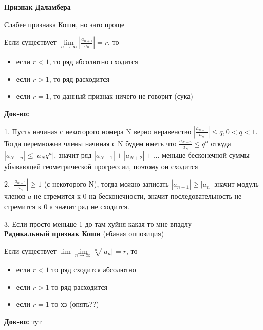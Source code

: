 \documentclass{article}
\begin{document}
	
	
	{\bf Признак Даламбера}
	
	Слабее признака Коши, но зато проще
	
	Если существует $\lim\limits_{n \rightarrow \infty}|\frac{a_{n + 1}}{a_n}| = r$, то 
	
	\begin{itemize}
		\item если $r < 1$, то ряд абсолютно сходится
		\item если $r > 1$, то ряд расходится
		\item если $r = 1$, то данный признак ничего не говорит (сука)
	\end{itemize}
	
	{\bf Док-во:}
	
	1. Пусть начиная с некоторого номера N верно неравенство $|\frac{a_{n+1}}{a_n}| \le q, 0 < q < 1$. Тогда перемножив члены начиная с N будем иметь что $\frac{a_{N+n}}{a_N} \le q^n$ откуда $|a_{N+n}| \le |a_{N}q^n|$, значит ряд $|a_{N+1}| + |a_{N+2}| + ...$ меньше бесконечной суммы убывающей геометрической прогрессии, поэтому он сходится
	
	2. $|\frac{a_{n + 1}}{a_n}| \ge 1$ (с некоторого N), тогда можно записать $|a_{n+1}| \ge |a_n|$ значит модуль членов $a$ не стремится к 0 на бесконечности, значит последовательность не стремится к 0 а значит ряд не сходится.
	
	3. Если просто меньше 1 до там хуйня какая-то мне впадлу
	\\
	
	{\bf Радикальный признак Коши} (ебаная оппозиция)
	
	Если существует $\lim\lim\limits_{n \rightarrow \infty} \sqrt[n]{|a_n|} = r$, то
	
	\begin{itemize}
		\item если $r < 1$ то ряд сходится абсолютно
		\item если $r > 1$ то ряд расходится
		\item если $r = 1$ то хз (опять??)
	\end{itemize}
	
	{\bf Док-во:} \href{https://ru.wikipedia.org/wiki/%D0%A0%D0%B0%D0%B4%D0%B8%D0%BA%D0%B0%D0%BB%D1%8C%D0%BD%D1%8B%D0%B9_%D0%BF%D1%80%D0%B8%D0%B7%D0%BD%D0%B0%D0%BA_%D0%9A%D0%BE%D1%88%D0%B8}{тут}
	\\
	
\end{document}
